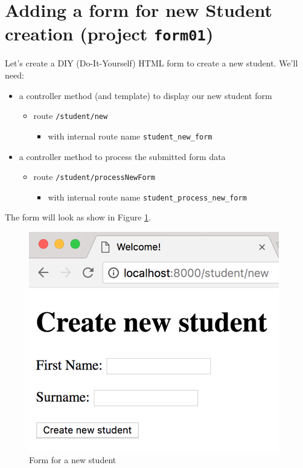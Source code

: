 \documentclass[a4paperpaper,openright]{book}
\providecommand{\tightlist}{%
  \setlength{\itemsep}{0pt}\setlength{\parskip}{0pt}}
\begin{document}
\hypertarget{adding-a-form-for-new-student-creation-project-form01}{%
\section{\texorpdfstring{Adding a form for new Student creation (project
\texttt{form01})}{Adding a form for new Student creation (project form01)}}\label{adding-a-form-for-new-student-creation-project-form01}}

Let's create a DIY (Do-It-Yourself) HTML form to create a new student.
We'll need:

\begin{itemize}
\item
  a controller method (and template) to display our new student form

  \begin{itemize}
  \item
    route \texttt{/student/new}

    \begin{itemize}
    \tightlist
    \item
      with internal route name \texttt{student\_new\_form}
    \end{itemize}
  \end{itemize}
\item
  a controller method to process the submitted form data

  \begin{itemize}
  \item
    route \texttt{/student/processNewForm}

    \begin{itemize}
    \tightlist
    \item
      with internal route name \texttt{student\_process\_new\_form}
    \end{itemize}
  \end{itemize}
\end{itemize}

The form will look as show in Figure \ref{new_student_form}.

\begin{figure}
\centering
\includegraphics{./tex2pdf.-8aed53dcd332a606/47fb9483958661b9823335391996ce0741d76a07.png}
\caption{Form for a new student \label{new_student_form}}
\end{figure}
\end{document}
